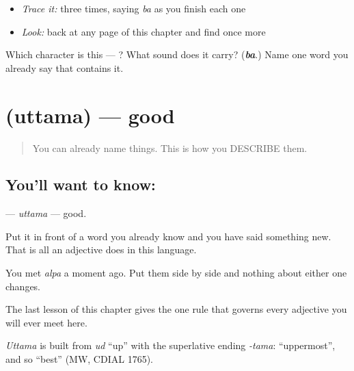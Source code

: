 \begin{quote}
\end{quote}

\begin{itemize}
\raggedright
  \item \emph{Trace it:}  three times, saying \emph{ba} as you finish each one
  \item \emph{Look:} back at any page of this chapter and find  once more
\end{itemize}

\begin{tcolorbox}[breakable,colback=teal!4,colframe=teal!35!black,title={Before you move on}]
Which character is this — ? What sound does it carry? (\emph{\textbf{ba}}.) Name one word you already say that contains it.
\end{tcolorbox}
\section[\texorpdfstring{\sk{उत्तम} (uttama)}{उत्तम (uttama)}]{ (uttama) — good}

\label{lesson:SA-C15-good}



\begin{quote}
You can already name things. This is how you DESCRIBE them.
\end{quote}

\subsection*{You'll want to know: }
\textbf{} — \emph{uttama} — good.

Put it in front of a word you already know and you have said something new. That is all an adjective does in this language.

You met \textbf{} \emph{alpa} a moment ago. Put them side by side and nothing about either one changes.

The last lesson of this chapter gives the one rule that governs every adjective you will ever meet here.

\begin{cousinweb}
\emph{Uttama} is built from \emph{ud} \textquotedblleft{}up\textquotedblright{} with the superlative ending \emph{-tama}: \textquotedblleft{}uppermost\textquotedblright{}, and so \textquotedblleft{}best\textquotedblright{} (MW, CDIAL 1765).
\end{cousinweb}

